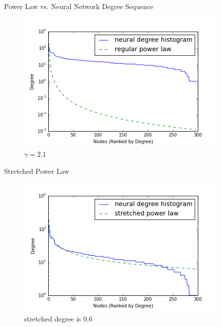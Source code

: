\documentclass[xcolor=dvipsnames,10pt]{beamer}
\begin{document}
\begin{frame}{Power Law vs. Neural Network Degree Sequence}


\begin{figure}
\begin{center}
\includegraphics[width=4in]{neuralsequenceplot2.png}
  \caption{$\gamma = 2.1$}
  \end{center}
  \end{figure}

\end{frame}

\begin{frame}{Stretched Power Law}

\begin{figure}
\begin{center}
\includegraphics[width=4in]{neuralsequenceplot.png}
\caption{stretched degree is 0.6}
  \end{center}
  \end{figure}

\end{frame}
\end{document}
